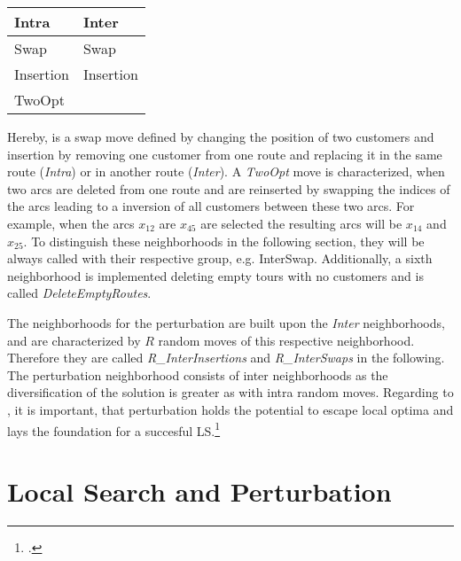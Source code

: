 \begin{table}[ht]
    \centering
    \begin{tabular}{@{}P{0.3\textwidth}P{0.3\textwidth}@{}}
        \toprule
        \textbf{Intra} & \textbf{Inter} \\
        \midrule
        Swap           & Swap           \\
        Insertion      & Insertion      \\
        TwoOpt         &                \\
        \bottomrule
    \end{tabular}
\end{table}
Hereby, is a swap move defined by changing the position of two customers and insertion by removing one customer from one route
and replacing it in the same route (\textit{Intra}) or in another route (\textit{Inter}). A \textit{TwoOpt} move is characterized, when two arcs are deleted
from one route and are reinserted by swapping the indices of the arcs leading to a inversion of all customers between these two arcs.
For example, when the arcs $x_{12}$ are $x_{45}$ are selected the resulting arcs will be $x_{14}$ and $x_{25}$. To distinguish these
neighborhoods in the following section, they will be always called with their respective group, e.g. InterSwap. Additionally, a sixth
neighborhood is implemented deleting empty tours with no customers and is called \textit{DeleteEmptyRoutes}.

\parbreak

The neighborhoods for the perturbation are built upon the \textit{Inter} neighborhoods, and are characterized by $R$ random moves of
this respective neighborhood. Therefore they are called \textit{R\_InterInsertions} and \textit{R\_InterSwaps} in the
following. The perturbation neighborhood consists of inter neighborhoods as the diversification of the solution is
greater as with intra random moves. Regarding to \cite{lourenco_iterated_2003}, it is important, that perturbation holds the potential
to escape local optima and lays the foundation for a succesful \gls{LS}.\footcite[cf.][pp. 329f.]{lourenco_iterated_2003}

\section{Local Search and Perturbation}
\label{sec:LSandPerturbation}

